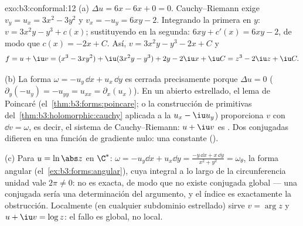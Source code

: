 \begin{solution}{exo:b3:conformal:12}
(a) $\Delta u = 6x - 6x + 0 = 0$. Cauchy--Riemann exige
$v_y = u_x = 3x^2 - 3y^2$ y $v_x = -u_y = 6xy - 2$. Integrando la
primera en $y$: $v = 3x^2y - y^3 + c(x)$; sustituyendo en la segunda:
$6xy + c'(x) = 6xy - 2$, de modo que $c(x)
= -2x + C$. Así, $v = 3x^2y - y^3 - 2x + C$ y
\[
f = u + \iu v = (x^3 - 3xy^2) + \iu(3x^2y - y^3)
+ 2y - 2\iu x + \iu C = z^3 - 2\iu z + \iu C .
\]

(b) La forma $\omega = -u_y\,\dd x + u_x\,\dd y$ es cerrada precisamente
porque $\Delta u = 0$ ($\partial_y(-u_y) =
-u_{yy} = u_{xx} = \partial_x(u_x)$). En un
abierto estrellado, el lema de
Poincaré (el~\cref{thm:b3:forms:poincare}; o la construcción de
primitivas del~\cref{thm:b3:holomorphic:cauchy} aplicada a la
 $u_x - \iu u_y$) proporciona
$v$ con $\dd v = \omega$, es decir, el sistema de Cauchy--Riemann:
$u + \iu v$ es . Dos
conjugadas difieren en una función de gradiente nulo: una constante
().

(c) Para $u = \ln\abs z$ en $\C^*$: $\omega = -u_y\dd x +
u_x\dd y = \frac{-y\,\dd x + x\,\dd y}{x^2 + y^2} =
\omega_\theta$, la forma angular (el~\cref{ex:b3:forms:angular}), cuya
integral a lo largo de la circunferencia unidad vale $2\pi \neq 0$: no
es exacta, de modo que no existe conjugada global --- una conjugada
sería una determinación 
del argumento, y el índice es exactamente la obstrucción. Localmente (en
cualquier subdominio estrellado) sirve $v =
\arg z$ y $u + \iu v = \log z$: el fallo es global, no local.
\end{solution}

